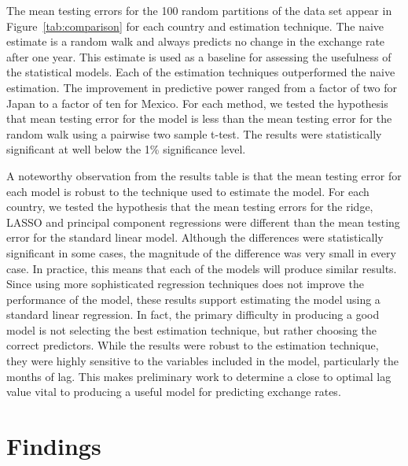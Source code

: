 \documentclass{sig-alternate-05-2015}
\begin{document}
The mean testing errors for the 100 random partitions of the data set appear in Figure~\ref{tab:comparison} for each country and estimation technique. The naive estimate is a random walk and always predicts no change in the exchange rate after one year. This estimate is used as a baseline for assessing the usefulness of the statistical models. Each of the estimation techniques outperformed the naive estimation. The improvement in predictive power ranged from a factor of two for Japan to a factor of ten for Mexico. For each method, we tested the hypothesis that mean testing error for the model is less than the mean testing error for the random walk using a pairwise two sample t-test. The results were statistically significant at well below the 1\% significance level.
\par{} A noteworthy observation from the results table is that the mean testing error for each model is robust to the technique used to estimate the model. For each country, we tested the hypothesis that the mean testing errors for the ridge, LASSO and principal component regressions were different than the mean testing error for the standard linear model. Although the differences were statistically significant in some cases, the magnitude of the difference was very small in every case. In practice, this means that each of the models will produce similar results. Since using more sophisticated regression techniques does not improve the performance of the model, these results support estimating the model using a standard linear regression. In fact, the primary difficulty in producing a good model is not selecting the best estimation technique, but rather choosing the correct predictors. While the results were robust to the estimation technique, they were highly sensitive to the variables included in the model, particularly the months of lag. This makes preliminary work to determine a close to optimal lag value vital to producing a useful model for predicting exchange rates.

\section{Findings}


     
\newenvironment{hangref}{\begin{list}{}{\setlength{\itemsep}{0pt}
\setlength{\parsep}{0pt}\setlength{\rightmargin}{0pt}
\setlength{\leftmargin}{+\parindent}
\setlength{\itemindent}{-\parindent}}}{\end{list}}
\end{document}
